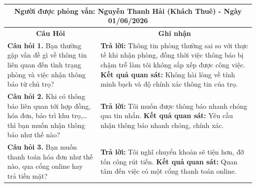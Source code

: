 \documentclass[a4paper,oneside]{report}
\begin{document}
\noindent
\begin{tabularx}{\textwidth}{|p{}|X|}
\hline
\multicolumn{2}{|c|}{\textbf{Người được phỏng vấn: Nguyễn Thanh Hải (Khách Thuê) - Ngày 01/06/2026}} \\ \hline
\multicolumn{1}{|c}{\textbf{Câu Hỏi}} & \multicolumn{1}{c|}{\textbf{Ghi nhận}} \\ \hline
\textbf{\color{red}Câu hỏi 1.} Bạn thường gặp vấn đề gì về thông tin liên quan đến tình trạng phòng và việc nhận thông báo từ chủ trọ? & \textbf{\color{red}Trả lời:} Thông tin phòng thường sai so với thực tế khi nhận phòng, đồng thời việc thông báo bị chậm trễ làm tôi không sắp xếp được công việc.\newline
\textbf{\color{red}Kết quả quan sát:} Không hài lòng về tính minh bạch và độ chính xác thông tin của trọ. \\ \hline
\textbf{\color{red}Câu hỏi 2.} Khi có thông báo liên quan tới hợp đồng, hóa đơn, bảo trì khu trọ,…thì bạn muốn nhận thông báo như thế nào? & \textbf{\color{red}Trả lời:} Tôi muốn được thông báo nhanh chóng qua tin nhắn. \newline
\textbf{\color{red}Kết quả quan sát:} Yêu cầu nhận thông báo nhanh chóng, chính xác. \\ \hline
\textbf{\color{red}Câu hỏi 3.} Bạn muốn thanh toán hóa đơn như thế nào, qua cổng online hay trả tiền mặt? & \textbf{\color{red}Trả lời:} Tôi nghĩ chuyển khoản sẽ tiện hơn, đỡ tốn công rút tiền. \newline
\textbf{\color{red}Kết quả quan sát:} Quan tâm đến việc có một cổng thanh toán online. \\ \hline
\end{tabularx}

\vspace{0.5cm}
\end{document}
